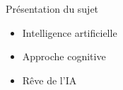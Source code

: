 \begin{frame}{Présentation du sujet}
	\begin{itemize}
		\item Intelligence artificielle
		\pause
		\item Approche cognitive
		\pause
		\item Rêve de l'IA
	\end{itemize}
\end{frame}
